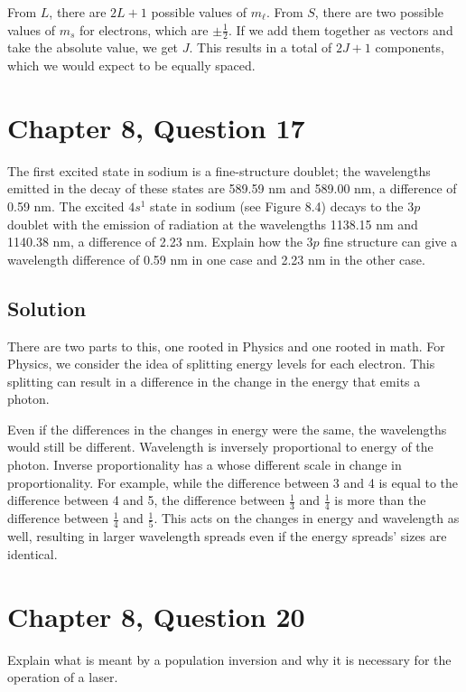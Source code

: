 \documentclass[12pt]{article}
\begin{document}
            From $L$, there are $2L + 1$ possible values of $m_\ell$.
            From $S$, there are two possible values of $m_s$ for electrons, which are $\pm \frac{1}{2}$.
            If we add them together as vectors and take the absolute value, we get $J$.
            This results in a total of $2J + 1$ components, which we would expect to be equally spaced.
    \pagebreak
    
    \section{Chapter 8, Question 17}
        The first excited state in sodium is a ﬁne-structure doublet; the wavelengths emitted in the decay of these states are 589.59 nm and 589.00 nm, a difference of 0.59 nm.
        The excited $4s^1$ state in sodium (see Figure 8.4) decays to the $3p$ doublet with the emission of radiation at the wavelengths 1138.15 nm and 1140.38 nm, a difference of 2.23 nm. 
        Explain how the $3p$ ﬁne structure can give a wavelength difference of 0.59 nm in one case and 2.23 nm in the other case.

        \subsection{Solution}
            There are two parts to this, one rooted in Physics and one rooted in math.
            For Physics, we consider the idea of splitting energy levels for each electron.
            This splitting can result in a difference in the change in the energy that emits a photon.

            Even if the differences in the changes in energy were the same, the wavelengths would still be different. 
            Wavelength is inversely proportional to energy of the photon.
            Inverse proportionality has a whose different scale in change in proportionality.
            For example, while the difference between 3 and 4 is equal to the difference between 4 and 5, the difference between $\frac{1}{3}$ and $\frac{1}{4}$ is more than the difference between $\frac{1}{4}$ and $\frac{1}{5}$.
            This acts on the changes in energy and wavelength as well, resulting in larger wavelength spreads even if the energy spreads' sizes are identical.
    \pagebreak
    
    \section{Chapter 8, Question 20}
        Explain what is meant by a population inversion and why it is necessary for the operation of a laser.
\end{document}
